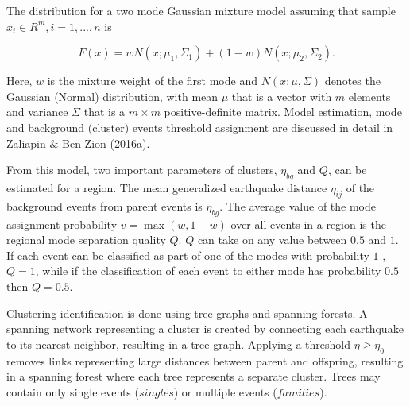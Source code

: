\documentclass[12pt]{article} %
\theoremstyle{plain}
\begin{document}
	
	The distribution for a two mode Gaussian mixture model assuming that sample $x_i \in R^m, i=1,...,n$ is
	
	\begin{equation} \label{eq:gaussian_mixture_model}
	F(x) = wN(x; \mu_1, \Sigma_1)+(1-w)N(x; \mu_2, \Sigma_2).
	\end{equation}

	\noindent Here, $w$ is the mixture weight of the first mode and $N(x;\mu,\Sigma)$ denotes the Gaussian (Normal) distribution, with mean $\mu$ that is a vector with $m$ elements and variance $\Sigma$ that is a  $m \times m$ positive-definite matrix. Model estimation, mode and background (cluster) events threshold assignment are discussed in detail in Zaliapin $\&$ Ben-Zion (2016a). 
	
	From this model, two important parameters of clusters, $\eta_{bg}$ and $Q$, can be estimated for a region.  The mean generalized earthquake distance $\eta_{ij}$  of the background events from parent events is $\eta_{bg}$. The average value of the mode assignment probability $v = \max(w,1-w)$ over all events in a region is the regional mode separation quality $Q$. $Q$ can take on any value between $0.5$ and $1$. If each event can be classified as part of one of the modes with probability $1$ , $Q=1$, while if the classification of each event to either mode has probability $0.5$ then $Q = 0.5$. 
	
	Clustering identification is done using tree graphs and spanning forests. A spanning network representing a cluster is created by connecting each earthquake to its nearest neighbor, resulting in a tree graph. Applying a threshold $\eta \geq \eta_0$ removes links representing large distances between parent and offspring, resulting in a spanning forest where each tree represents a separate cluster. Trees may contain only single events ($\textit{singles}$) or multiple events ($\textit{families}$).
	
\end{document}
